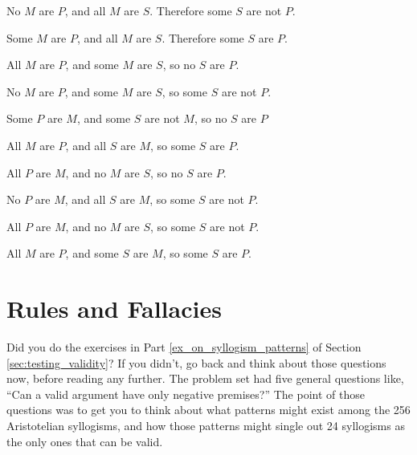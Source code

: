 \begin{exercises} 

\item No $M$ are $P$, and all $M$ are $S$. Therefore some $S$ are not $P$.
   
\item Some $M$ are $P$, and all $M$ are $S$. Therefore some $S$ are $P$.
 
\item All $M$ are $P$, and some $M$ are $S$, so no $S$ are $P$.
 
    
\item No $M$ are $P$, and some $M$ are $S$, so some $S$ are not $P$. 
 
 
\item Some $P$ are $M$, and some $S$ are not $M$, so no $S$ are $P$
 
\item All $M$ are $P$, and all $S$ are $M$, so some $S$ are $P$. 
 
\item All $P$ are $M$, and no $M$ are $S$, so no $S$ are $P$. 
 
\item No $P$ are $M$, and all $S$ are $M$, so some $S$ are not $P$.
 
\item All $P$ are $M$, and no $M$ are $S$, so some $S$ are not $P$.  
 
\item All $M$ are $P$, and some $S$ are $M$, so some $S$ are $P$. 
 
\end{exercises}



\section{Rules and Fallacies}
\label{sec:rules_and_fallacies}
Did you do the exercises in Part \ref{ex_on_syllogism_patterns} of Section \ref{sec:testing_validity}? If you didn't, go back and think about those questions now, before reading any further. The problem set had five general questions like, ``Can a valid argument have only negative premises?'' The point of those questions was to get you to think about what patterns might exist among the 256 Aristotelian syllogisms, and how those patterns might single out 24 syllogisms as the only ones that can be valid. 


